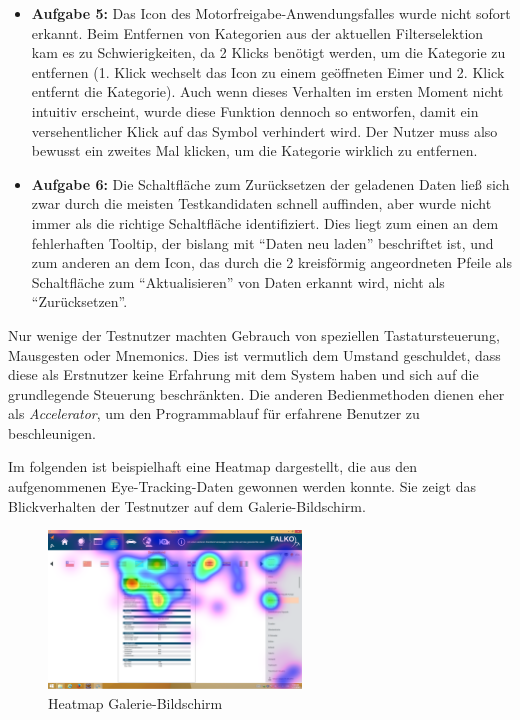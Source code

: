 \begin{itemize}
\item \textbf{Aufgabe 5:} Das Icon des Motorfreigabe-Anwendungsfalles wurde nicht sofort erkannt. Beim Entfernen von Kategorien aus der aktuellen Filterselektion kam es zu Schwierigkeiten, da 2 Klicks benötigt werden, um die Kategorie zu entfernen (1. Klick wechselt das Icon zu einem geöffneten Eimer und 2. Klick entfernt die Kategorie). Auch wenn dieses Verhalten im ersten Moment nicht intuitiv erscheint, wurde diese Funktion dennoch so entworfen, damit ein versehentlicher Klick auf das Symbol verhindert wird. Der Nutzer muss also bewusst ein zweites Mal klicken, um die Kategorie wirklich zu entfernen.
\item \textbf{Aufgabe 6:} Die Schaltfläche zum Zurücksetzen der geladenen Daten ließ sich zwar durch die meisten Testkandidaten schnell auffinden, aber wurde nicht immer als die richtige Schaltfläche identifiziert. Dies liegt zum einen an dem fehlerhaften Tooltip, der bislang mit \enquote{Daten neu laden} beschriftet ist, und zum anderen an dem Icon, das durch die 2 kreisförmig angeordneten Pfeile als Schaltfläche zum \enquote{Aktualisieren} von Daten erkannt wird, nicht als \enquote{Zurücksetzen}.
\end{itemize}
Nur wenige der Testnutzer machten Gebrauch von speziellen Tastatursteuerung, Mausgesten oder Mnemonics. Dies ist vermutlich dem Umstand geschuldet, dass diese als Erstnutzer keine Erfahrung mit dem System haben und sich auf die grundlegende Steuerung beschränkten. Die anderen Bedienmethoden dienen eher als \textit{Accelerator}, um den Programmablauf für erfahrene Benutzer zu beschleunigen.\par
Im folgenden ist beispielhaft eine Heatmap dargestellt, die aus den aufgenommenen Eye-Tracking-Daten gewonnen werden konnte. Sie zeigt das Blickverhalten der Testnutzer auf dem Galerie-Bildschirm.\par
\begin{figure}[H]
 \centering
 \includegraphics[width=0.6\textwidth]{grafiken/gallery_heatmap.png}
 \caption{Heatmap Galerie-Bildschirm}
 \label{fig:galleryHeatmap}
\end{figure}
